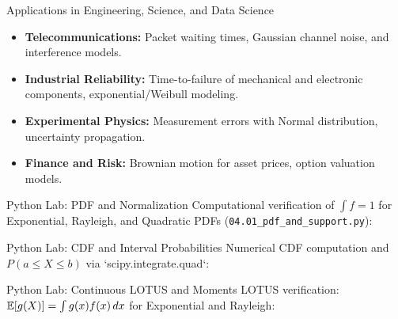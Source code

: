 \documentclass[aspectratio=169,xcolor={dvipsnames,table}]{beamer}
\begin{document}
\begin{frame}{Applications in Engineering, Science, and Data Science}
	\vspace{-0.1cm}
	\begin{itemize}\itemsep=0.1cm
		\item \textbf{Telecommunications:} Packet waiting times, Gaussian channel noise, and interference models. \pause
		\item \textbf{Industrial Reliability:} Time-to-failure of mechanical and electronic components, exponential/Weibull modeling. \pause
		\item \textbf{Experimental Physics:} Measurement errors with Normal distribution, uncertainty propagation. \pause
		\item \textbf{Finance and Risk:} Brownian motion for asset prices, option valuation models.
	\end{itemize}
\end{frame}

\begin{frame}[fragile]{Python Lab: PDF and Normalization}
	\vspace{-0.05cm}
	\scriptsize
	Computational verification of $\int f = 1$ for Exponential, Rayleigh, and Quadratic PDFs (\texttt{04.01\_pdf\_and\_support.py}):
	\vspace{0.02cm}
	{
	}
\end{frame}

\begin{frame}[fragile]{Python Lab: CDF and Interval Probabilities}
	\vspace{-0.05cm}
	\scriptsize
	Numerical CDF computation and $P(a \le X \le b)$ via `scipy.integrate.quad`:
	\vspace{0.02cm}
	{
	}
\end{frame}

\begin{frame}[fragile]{Python Lab: Continuous LOTUS and Moments}
	\vspace{-0.05cm}
	\scriptsize
	LOTUS verification: $\mathbb{E}[g(X)] = \int g(x) f(x)\,dx$ for Exponential and Rayleigh:
	\vspace{0.02cm}
	{
	}
\end{frame}
\end{document}
